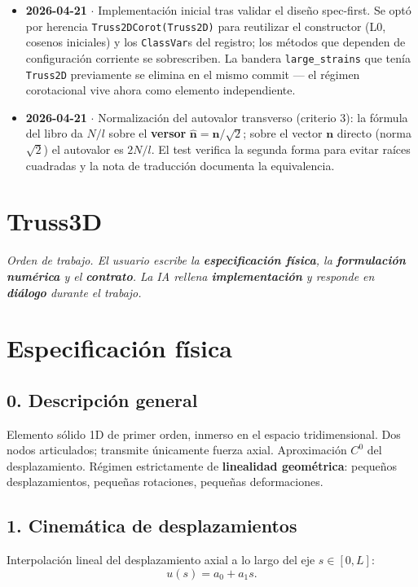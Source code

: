 \documentclass[11pt,letterpaper,oneside]{report}
\begin{document}
\begin{itemize}
  \item \textbf{2026-04-21} \ensuremath{\cdot} Implementación inicial tras validar el diseño spec-first. Se optó por herencia \texttt{Truss2DCorot(Truss2D)} para reutilizar el constructor (L0, cosenos iniciales) y los \texttt{ClassVar}s del registro; los métodos que dependen de configuración corriente se sobrescriben. La bandera \texttt{large\_strains} que tenía \texttt{Truss2D} previamente se elimina en el mismo commit --- el régimen corotacional vive ahora como elemento independiente.
  \item \textbf{2026-04-21} \ensuremath{\cdot} Normalización del autovalor transverso (criterio 3): la fórmula del libro da $N/l$ sobre el \textbf{versor} $\hat{\mathbf n} = \mathbf n/\sqrt 2$; sobre el vector $\mathbf n$ directo (norma $\sqrt 2$) el autovalor es $2N/l$. El test verifica la segunda forma para evitar raíces cuadradas y la nota de traducción documenta la equivalencia.
\end{itemize}


\newpage

\section{Truss3D}



\textit{Orden de trabajo. El usuario escribe la \textbf{especificación física}, la \textbf{formulación numérica} y el \textbf{contrato}. La IA rellena \textbf{implementación} y responde en \textbf{diálogo} durante el trabajo.}



\section{Especificación física}

\subsection{0. Descripción general}
Elemento sólido 1D de primer orden, inmerso en el espacio tridimensional. Dos nodos articulados; transmite únicamente fuerza axial. Aproximación $C^0$ del desplazamiento. Régimen estrictamente de \textbf{linealidad geométrica}: pequeños desplazamientos, pequeñas rotaciones, pequeñas deformaciones.

\subsection{1. Cinemática de desplazamientos}
Interpolación lineal del desplazamiento axial a lo largo del eje $s \in [0, L]$:
\[
u(s) = a_0 + a_1 s.
\]
\end{document}
